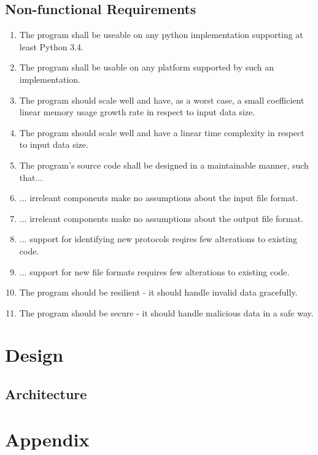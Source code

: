 \documentclass[10pt,a4paper,notitlepage]{report}
\begin{document}
\section{Non-functional Requirements}

\begin{enumerate}[label=\bfseries NFR\arabic*:]
\item \label{nfr:1} The program shall be useable on any python implementation supporting at least Python 3.4.
\item \label{nfr:2} The program shall be usable on any platform supported by such an implementation.
\item \label{nfr:3} The program should scale well and have, as a worst case, a small coefficient linear memory usage growth rate in respect to input data size.
\item \label{nfr:4} The program should scale well and have a linear time complexity in respect to input data size.
\item \label{nfr:5} The program's source code shall be designed in a maintainable manner, such that...
\item \label{nfr:6} ... irreleant components make no assumptions about the input file format.
\item \label{nfr:7} ... irreleant components make no assumptions about the output file format.
\item \label{nfr:8} ... support for identifying new protocols reqires few alterations to existing code.
\item \label{nfr:9} ... support for new file formats requires few alterations to existing code.
\item \label{nfr:10} The program should be resilient - it should handle invalid data gracefully.
\item \label{nfr:11} The program should be secure - it should handle malicious data in a safe way.
\end{enumerate}

\chapter{Design}
\section{Architecture}

\chapter{Appendix}
\end{document}
